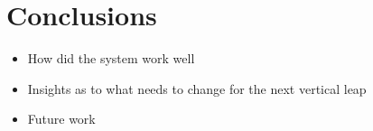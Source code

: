 \section{Conclusions}
\begin{itemize}
\item How did the system work well
\item Insights as to what needs to change for the next vertical leap 
\item Future work
\end{itemize}
